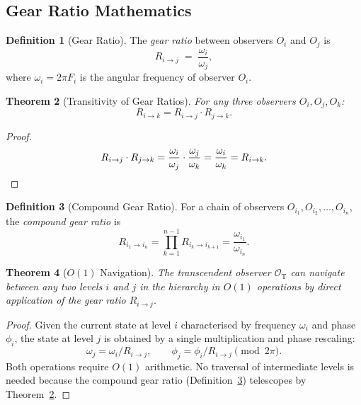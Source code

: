 \documentclass[11pt,twocolumn,a4paper]{article}
\newtheorem{theorem}{Theorem}[section]
\theoremstyle{definition}
\newtheorem{definition}[theorem]{Definition}
\theoremstyle{remark}
\newcommand{\OT}{\mathcal{O}_{\mathrm{T}}}
\begin{document}
\subsection{Gear Ratio Mathematics}\label{sec:gear}

\begin{definition}[Gear Ratio]\label{def:gear_ratio}
The \emph{gear ratio} between observers $O_i$ and $O_j$ is
\begin{equation}\label{eq:gear_ratio}
  R_{i\to j} \;=\; \frac{\omega_i}{\omega_j},
\end{equation}
where $\omega_i=2\pi F_i$ is the angular frequency of observer $O_i$.
\end{definition}

\begin{theorem}[Transitivity of Gear Ratios]\label{thm:transitivity}
For any three observers $O_i, O_j, O_k$:
\begin{equation}\label{eq:transitivity}
  R_{i\to k} = R_{i\to j}\cdot R_{j\to k}.
\end{equation}
\end{theorem}

\begin{proof}
\[
  R_{i\to j}\cdot R_{j\to k}
  = \frac{\omega_i}{\omega_j}\cdot\frac{\omega_j}{\omega_k}
  = \frac{\omega_i}{\omega_k}
  = R_{i\to k}.\qedhere
\]
\end{proof}

\begin{definition}[Compound Gear Ratio]\label{def:compound}
For a chain of observers $O_{i_1},O_{i_2},\ldots,O_{i_n}$, the
\emph{compound gear ratio} is
\begin{equation}\label{eq:compound}
  R_{i_1\to i_n} = \prod_{k=1}^{n-1} R_{i_k\to i_{k+1}}
  = \frac{\omega_{i_1}}{\omega_{i_n}}.
\end{equation}
\end{definition}

\begin{theorem}[$O(1)$ Navigation]\label{thm:navigation}
The transcendent observer $\OT$ can navigate between any two levels $i$ and
$j$ in the hierarchy in $O(1)$ operations by direct application of the gear
ratio $R_{i\to j}$.
\end{theorem}

\begin{proof}
Given the current state at level $i$ characterised by frequency $\omega_i$
and phase $\phi_i$, the state at level $j$ is obtained by a single
multiplication and phase rescaling:
\[
  \omega_j = \omega_i / R_{i\to j},\qquad
  \phi_j = \phi_i / R_{i\to j} \pmod{2\pi}.
\]
Both operations require $O(1)$ arithmetic.  No traversal of intermediate
levels is needed because the compound gear ratio
(Definition~\ref{def:compound}) telescopes by
Theorem~\ref{thm:transitivity}.
\end{proof}
\end{document}
